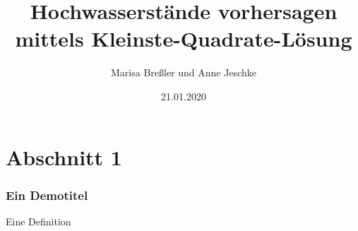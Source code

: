 \documentclass{beamer}
\title{Hochwasserstände vorhersagen mittels Kleinste-Quadrate-Lösung}
\author{Marisa Breßler und Anne Jeschke}
\date{21.01.2020}
\begin{document}
\maketitle
\frame{\tableofcontents[currentsection]}

\section{Abschnitt 1}
\begin{frame} %
  \frametitle{Ein Demotitel} %
  \begin{Definition} %
    Eine Definition
  \end{Definition}
\end{frame}
\end{document}
